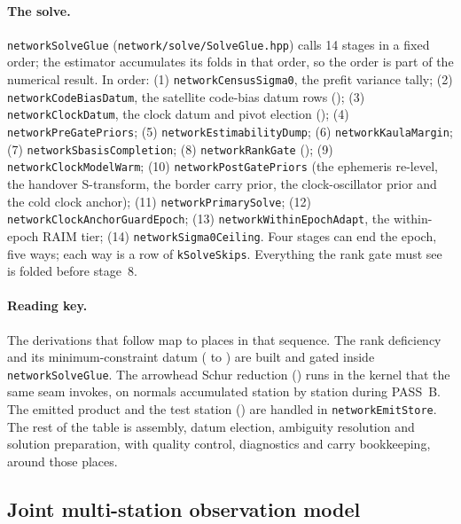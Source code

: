 \documentclass[main.tex]{subfiles}
\begin{document}
\paragraph{The solve.}
\texttt{networkSolveGlue} (\texttt{network/solve/SolveGlue.hpp}) calls 14
stages in a fixed order; the estimator accumulates its folds in that
order, so the order is part of the numerical result. In order: (1)
\texttt{networkCensusSigma0}, the prefit variance tally; (2)
\texttt{networkCodeBiasDatum}, the satellite code-bias datum rows
(); (3) \texttt{networkClockDatum}, the clock
datum and pivot election (); (4)
\texttt{networkPreGatePriors}; (5) \texttt{networkEstimabilityDump}; (6)
\texttt{networkKaulaMargin}; (7) \texttt{networkSbasisCompletion}; (8)
\texttt{networkRankGate} (); (9)
\texttt{networkClockModelWarm}; (10) \texttt{networkPostGatePriors}
(the ephemeris re-level, the handover S-transform, the border carry
prior, the clock-oscillator prior and the cold clock anchor); (11)
\texttt{networkPrimarySolve}; (12) \texttt{networkClockAnchorGuardEpoch};
(13) \texttt{networkWithinEpochAdapt}, the within-epoch RAIM tier; (14)
\texttt{networkSigma0Ceiling}. Four stages can end the epoch, five ways;
each way is a row of \texttt{kSolveSkips}. Everything the rank gate must
see is folded before stage~8.

\paragraph{Reading key.}
The derivations that follow map to places in that sequence. The rank
deficiency and its minimum-constraint datum ( to
) are built and gated inside
\texttt{networkSolveGlue}. The arrowhead Schur reduction
() runs in the kernel that the same seam invokes, on
normals accumulated station by station during PASS~B. The emitted
product and the test station () are handled in
\texttt{networkEmitStore}. The rest of the table is assembly, datum
election, ambiguity resolution and solution preparation, with quality
control, diagnostics and carry bookkeeping, around those places.

\subsection{Joint multi-station observation model}\label{sec:net-model}
\end{document}
